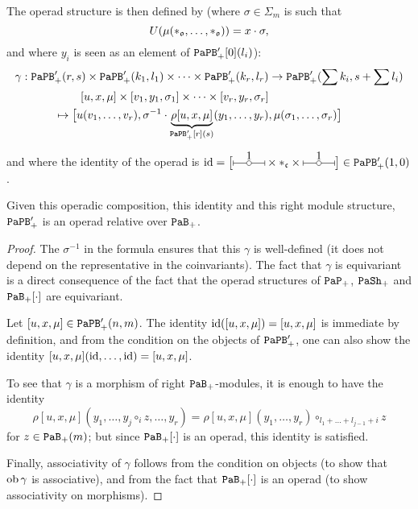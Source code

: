 The operad structure is then defined by (where $\sigma \in \Sigma_{m}$ is such that
\[ U(\mu(*_{\mathfrak{o}}, \dots, *_{\mathfrak{o}})) = x \cdot \sigma, \]
and where $y_{i}$ is seen as an element of $\mathtt{PaPB}'_{+}[0](l_{i})$):
\begin{align}
  \gamma : \mathtt{PaPB}_+'(r,s) \times \mathtt{PaPB}_+'(k_{1}, l_{1}) \times \dots \times \mathtt{PaPB}_+'(k_{r}, l_{r})
  & \to \mathtt{PaPB}_+'(\sum k_{i}, s + \sum l_{i})
    \nonumber \\
  [u,x,\mu] \times [v_{1}, y_{1}, \sigma_{1}] \times \dots \times
  [v_{r}, y_{r}, \sigma_{r}]
  & \nonumber \\
  \mapsto \bigl[ u(v_{1}, \dots, v_{r}), \sigma^{-1} \cdot
  \underbrace{\rho[u,x,\mu]}_{\mathtt{PaPB}'_{+}[r](s)} (y_{1},
  \dots, y_{r})
  &, \mu(\sigma_{1}, \dots, \sigma_{r}) \bigr]
    \label{sw.eq.op-papb-var}
\end{align}
and where the identity of the operad is $\id = \bigl[ \tikz{\draw[|-|] (0,0) -- (1,0); \wdot{0.5,0}{1};} \times *_{\col{c}} \times \tikz{\draw[|-|] (0,0) -- (1,0); \wdot{0.5,0}{1};} \bigr] \in \PaPB_{+}'(1,0)$.

\begin{proposition} \label{sw.prop.papb-var-operade}
  Given this operadic composition, this identity and this right module structure, $\mathtt{PaPB}_{+}'$ is an operad relative over $\mathtt{PaB}_{+}$.
\end{proposition}
\begin{proof}
  The $\sigma^{-1}$ in the formula ensures that this $\gamma$ is well-defined (it does not depend on the representative in the coinvariants).
  The fact that $\gamma$ is equivariant is a direct consequence of the fact that the operad structures of $\mathtt{PaP}_{+}$, $\mathtt{PaSh}_{+}$ and $\mathtt{PaB}_{+}[\cdot]$ are equivariant.

  Let $[u,x,\mu] \in \mathtt{PaPB}'_{+}(n,m)$.
  The identity $\operatorname{id}([u,x,\mu]) = [u,x,\mu]$ is immediate by definition, and from the condition on the objects of $\mathtt{PaPB}'_{+}$, one can also show the identity $[u,x,\mu](\operatorname{id}, \dots, \operatorname{id}) = [u,x,\mu]$.

  To see that $\gamma$ is a morphism of right $\mathtt{PaB}_{+}$-modules, it is enough to have the identity
  \[ \rho[u,x,\mu](y_{1}, \dots, y_{j} \circ_{i} z, \dots, y_{r}) = \rho[u,x,\mu](y_{1}, \dots, y_{r}) \circ_{l_{1} + \dots + l_{j-1} + i} z \]
  for $z \in \mathtt{PaB}_{+}(m)$; but since $\mathtt{PaB}_{+}[\cdot]$ is an operad, this identity is satisfied.

  Finally, associativity of $\gamma$ follows from the condition on objects (to show that $\operatorname{ob} \gamma$ is associative), and from the fact that $\mathtt{PaB}_{+}[\cdot]$ is an operad (to show associativity on morphisms).
\end{proof}

